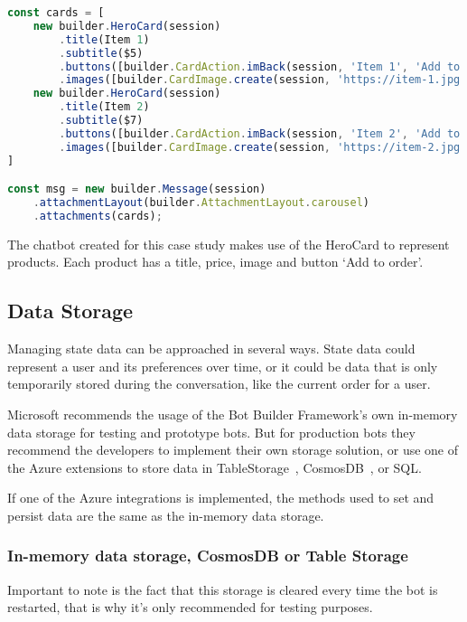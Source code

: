 \begin{lstlisting}[language=JavaScript,caption={Example of how to construct some HeroCards and display them in a carousel},label={listing:send-hero-card}]
const cards = [
	new builder.HeroCard(session)
		.title(Item 1)
		.subtitle($5)
		.buttons([builder.CardAction.imBack(session, 'Item 1', 'Add to order')])
		.images([builder.CardImage.create(session, 'https://item-1.jpg')])),
	new builder.HeroCard(session)
		.title(Item 2)
		.subtitle($7)
		.buttons([builder.CardAction.imBack(session, 'Item 2', 'Add to order')])
		.images([builder.CardImage.create(session, 'https://item-2.jpg')])),
]

const msg = new builder.Message(session)
	.attachmentLayout(builder.AttachmentLayout.carousel)
	.attachments(cards);
\end{lstlisting}

The chatbot created for this case study makes use of the HeroCard to represent products. Each product has a title, price, image and button `Add to order'.

\subsection{Data Storage}

Managing state data can be approached in several ways. State data could represent a user and its preferences over time, or it could be data that is only temporarily stored during the conversation, like the current order for a user.

Microsoft recommends the usage of the Bot Builder Framework's own in-memory data storage for testing and prototype bots. But for production bots they recommend the developers to implement their own storage solution, or use one of the Azure extensions to store data in \Gls{TableStorage}~\cite{table-storage}, \Gls{CosmosDB}~\cite{cosmosdb}, or SQL.

If one of the Azure integrations is implemented, the methods used to set and persist data are the same as the in-memory data storage.

\subsubsection{In-memory data storage, CosmosDB or Table Storage}

Important to note is the fact that this storage is cleared every time the bot is restarted, that is why it's only recommended for testing purposes.

